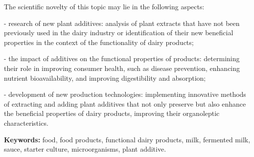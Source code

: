 The scientific novelty of this topic may lie in the following aspects:

- research of new plant additives: analysis of plant extracts that have
not been previously used in the dairy industry or identification of
their new beneficial properties in the context of the functionality of
dairy products;

- the impact of additives on the functional properties of products:
determining their role in improving consumer health, such as disease
prevention, enhancing nutrient bioavailability, and improving
digestibility and absorption;

- development of new production technologies: implementing innovative
methods of extracting and adding plant additives that not only preserve
but also enhance the beneficial properties of dairy products, improving
their organoleptic characteristics.

{\bfseries Keywords:} food, food products, functional dairy products, milk,
fermented milk, sauce, starter culture, microorganisms, plant additive.

